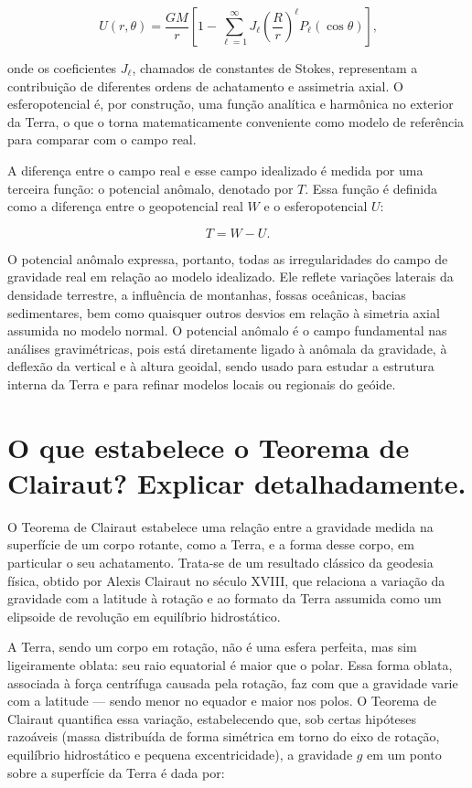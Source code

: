 \[
U(r, \theta) = \frac{GM}{r} \left[1 - \sum_{\ell=1}^\infty J_\ell \left( \frac{R}{r} \right)^\ell P_\ell(\cos \theta) \right] \text{,}
\]

onde os coeficientes \( J_\ell \), chamados de constantes de Stokes, representam a contribuição de diferentes ordens de achatamento e assimetria axial. O esferopotencial é, por construção, uma função analítica e harmônica no exterior da Terra, o que o torna matematicamente conveniente como modelo de referência para comparar com o campo real.

A diferença entre o campo real e esse campo idealizado é medida por uma terceira função: o potencial anômalo, denotado por \( T \). Essa função é definida como a diferença entre o geopotencial real \( W \) e o esferopotencial \( U \):

\[
T = W - U \text{.}
\]

O potencial anômalo expressa, portanto, todas as irregularidades do campo de gravidade real em relação ao modelo idealizado. Ele reflete variações laterais da densidade terrestre, a influência de montanhas, fossas oceânicas, bacias sedimentares, bem como quaisquer outros desvios em relação à simetria axial assumida no modelo normal. O potencial anômalo é o campo fundamental nas análises gravimétricas, pois está diretamente ligado à anômala da gravidade, à deflexão da vertical e à altura geoidal, sendo usado para estudar a estrutura interna da Terra e para refinar modelos locais ou regionais do geóide.


\section{O que estabelece o Teorema de Clairaut? Explicar detalhadamente.}

O Teorema de Clairaut estabelece uma relação entre a gravidade medida na superfície de um corpo rotante, como a Terra, e a forma desse corpo, em particular o seu achatamento. Trata-se de um resultado clássico da geodesia física, obtido por Alexis Clairaut no século XVIII, que relaciona a variação da gravidade com a latitude à rotação e ao formato da Terra assumida como um elipsoide de revolução em equilíbrio hidrostático.

A Terra, sendo um corpo em rotação, não é uma esfera perfeita, mas sim ligeiramente oblata: seu raio equatorial é maior que o polar. Essa forma oblata, associada à força centrífuga causada pela rotação, faz com que a gravidade varie com a latitude — sendo menor no equador e maior nos polos. O Teorema de Clairaut quantifica essa variação, estabelecendo que, sob certas hipóteses razoáveis (massa distribuída de forma simétrica em torno do eixo de rotação, equilíbrio hidrostático e pequena excentricidade), a gravidade \( g \) em um ponto sobre a superfície da Terra é dada por:

